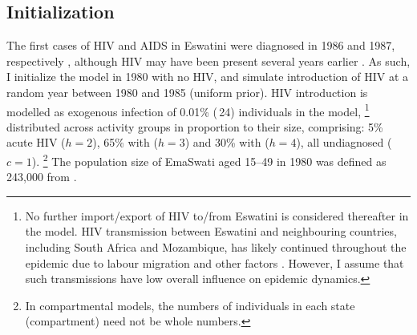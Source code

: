 \subsection{Initialization}\label{model.par.init}
The first cases of HIV and AIDS in Eswatini
were diagnosed in 1986 and 1987, respectively \cite{Whiteside2007},
although HIV may have been present several years earlier \cite{Iliffe2005}.
As such, I initialize the model in 1980 with no HIV,
and simulate introduction of HIV at a random year between 1980 and 1985 (uniform prior).
HIV introduction is modelled as
exogenous infection of 0.01\% (\ttilde\,24) individuals in the model,%
\footnote{No further import/export of HIV to/from Eswatini is considered thereafter in the model.
  HIV transmission between Eswatini and neighbouring countries,
  including South Africa and Mozambique,
  has likely continued throughout the epidemic
  due to labour migration and other factors \cite{Iliffe2005}.
  However, I assume that such transmissions have low overall influence on epidemic dynamics.}
distributed across activity groups in proportion to their size, comprising:
5\% acute HIV ($h=2$), 65\% with  ($h=3$) and 30\% with  ($h=4$),
all undiagnosed ($c=1$).%
\footnote{In compartmental models, the numbers of individuals in each state (compartment)
  need not be whole numbers.}
The population size of EmaSwati aged 15--49 in 1980
was defined as 243,000 from \cite{WorldBank}.
